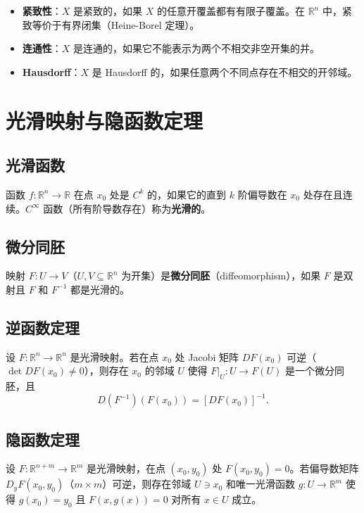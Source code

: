 \begin{itemize}
    \item \textbf{紧致性}：$X$ 是紧致的，如果 $X$ 的任意开覆盖都有有限子覆盖。在 $\mathbb{R}^n$ 中，紧致等价于有界闭集（Heine-Borel 定理）。
    \item \textbf{连通性}：$X$ 是连通的，如果它不能表示为两个不相交非空开集的并。
    \item \textbf{Hausdorff}：$X$ 是 Hausdorff 的，如果任意两个不同点存在不相交的开邻域。
\end{itemize}

\section{光滑映射与隐函数定理}

\subsection{光滑函数}

函数 $f: \mathbb{R}^n \to \mathbb{R}$ 在点 $x_0$ 处是 $C^k$ 的，如果它的直到 $k$ 阶偏导数在 $x_0$ 处存在且连续。$C^\infty$ 函数（所有阶导数存在）称为\textbf{光滑的}。

\subsection{微分同胚}

映射 $F: U \to V$（$U, V \subseteq \mathbb{R}^n$ 为开集）是\textbf{微分同胚}（diffeomorphism），如果 $F$ 是双射且 $F$ 和 $F^{-1}$ 都是光滑的。

\subsection{逆函数定理}

设 $F: \mathbb{R}^n \to \mathbb{R}^n$ 是光滑映射。若在点 $x_0$ 处 Jacobi 矩阵 $DF(x_0)$ 可逆（$\det DF(x_0) \neq 0$），则存在 $x_0$ 的邻域 $U$ 使得 $F|_U: U \to F(U)$ 是一个微分同胚，且
\begin{equation}
    D(F^{-1})(F(x_0)) = [DF(x_0)]^{-1}.
\end{equation}

\subsection{隐函数定理}

设 $F: \mathbb{R}^{n+m} \to \mathbb{R}^m$ 是光滑映射，在点 $(x_0, y_0)$ 处 $F(x_0, y_0) = 0$。若偏导数矩阵 $D_y F(x_0, y_0)$（$m \times m$）可逆，则存在邻域 $U \ni x_0$ 和唯一光滑函数 $g: U \to \mathbb{R}^m$ 使得 $g(x_0) = y_0$ 且 $F(x, g(x)) = 0$ 对所有 $x \in U$ 成立。

